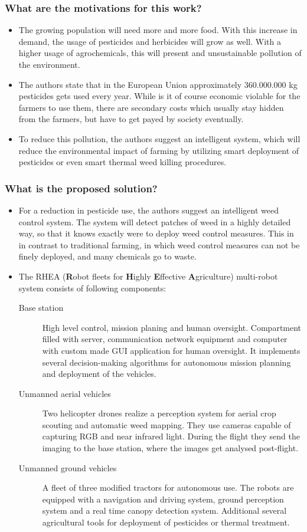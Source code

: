 \documentclass{article}
\begin{document}
\subsubsection*{What are the motivations for this work?}
\begin{itemize}
    \item The growing population will need more and more food. With this increase in demand, the usage of pesticides and herbicides will grow as well. With a higher usage of agrochemicals, this will present and unsustainable pollution of the environment.
    \item The authors state that in the European Union approximately 360.000.000 kg pesticides gets used every year. While is it of course economic violable for the farmers to use them, there are secondary costs which usually stay hidden from the farmers, but have to get payed by society eventually.
    \item To reduce this pollution, the authors suggest an intelligent system, which will reduce the environmental impact of farming by utilizing smart deployment of pesticides or even smart thermal weed killing procedures.
\end{itemize}
\subsubsection*{What is the proposed solution?}
\begin{itemize}
    \item For a reduction in pesticide use, the authors suggest an intelligent weed control system. The system will detect patches of weed in a highly detailed way, so that it knows exactly were to deploy weed control measures. This in in contrast to traditional farming, in which weed control measures can not be finely deployed, and many chemicals go to waste.
    \item The RHEA (\textbf{R}obot fleets for \textbf{H}ighly \textbf{E}ffective \textbf{A}griculture) multi-robot system consists of following components: \ \begin{description}
        \item[Base station]  High level control, mission planing and human oversight. Compartment filled with server, communication network equipment and computer with custom made GUI application for human oversight. It implements several decision-making algorithms for autonomous mission planning and deployment of the vehicles.
        \item[Unmanned aerial vehicles] Two helicopter drones realize a perception system for aerial crop scouting and automatic weed mapping. They use cameras capable of capturing RGB and near infrared light. During the flight they send the imaging to the base station, where the images get analysed post-flight.
        \item[Unmanned ground vehicles] A fleet of three modified tractors for autonomous use. The robots are equipped with a navigation and driving system, ground perception system and a real time canopy detection system. Additional several agricultural tools for deployment of pesticides or thermal treatment.
    \end{description}
\end{itemize}
\end{document}
